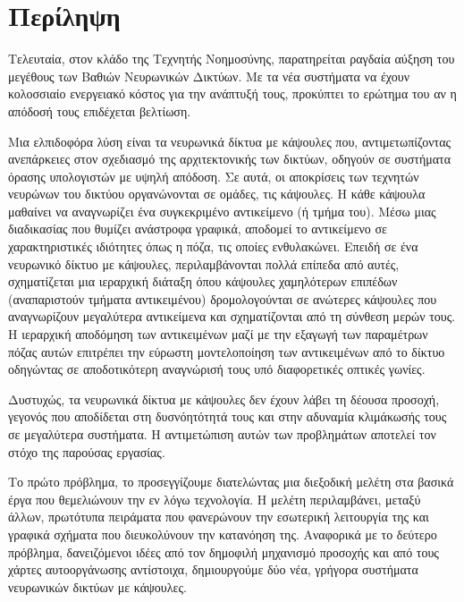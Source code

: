 \chapter*{Περίληψη}



Τελευταία, στον κλάδο της Τεχνητής Νοημοσύνης, παρατηρείται ραγδαία αύξηση του μεγέθους των Βαθιών Νευρωνικών Δικτύων. Με τα νέα συστήματα να έχουν κολοσσιαίο ενεργειακό κόστος για την ανάπτυξή τους, προκύπτει το ερώτημα του αν η απόδοσή τους επιδέχεται βελτίωση.\par

Μια ελπιδοφόρα λύση είναι τα νευρωνικά δίκτυα με κάψουλες που, αντιμετωπίζοντας ανεπάρκειες στον σχεδιασμό της αρχιτεκτονικής των δικτύων, οδηγούν σε συστήματα όρασης υπολογιστών με υψηλή απόδοση. Σε αυτά, οι αποκρίσεις των τεχνητών νευρώνων του δικτύου οργανώνονται σε ομάδες, τις κάψουλες. Η κάθε κάψουλα μαθαίνει να αναγνωρίζει ένα συγκεκριμένο αντικείμενο (ή τμήμα του). Μέσω μιας διαδικασίας που θυμίζει ανάστροφα γραφικά, αποδομεί το αντικείμενο σε χαρακτηριστικές ιδιότητες όπως η πόζα, τις οποίες ενθυλακώνει. Επειδή σε ένα νευρωνικό δίκτυο με κάψουλες, περιλαμβάνονται πολλά επίπεδα από αυτές, σχηματίζεται μια ιεραρχική διάταξη όπου κάψουλες χαμηλότερων επιπέδων (αναπαριστούν τμήματα αντικειμένου) δρομολογούνται σε ανώτερες κάψουλες που αναγνωρίζουν μεγαλύτερα αντικείμενα και σχηματίζονται από τη σύνθεση μερών τους. Η ιεραρχική αποδόμηση των αντικειμένων μαζί με την εξαγωγή των παραμέτρων πόζας αυτών επιτρέπει την εύρωστη μοντελοποίηση των αντικειμένων από το δίκτυο οδηγώντας σε αποδοτικότερη αναγνώρισή τους υπό διαφορετικές οπτικές γωνίες.\par

Δυστυχώς, τα νευρωνικά δίκτυα με κάψουλες δεν έχουν λάβει τη δέουσα προσοχή, γεγονός που αποδίδεται στη δυσνόητότητά τους και στην αδυναμία κλιμάκωσής τους σε μεγαλύτερα συστήματα. Η αντιμετώπιση αυτών των προβλημάτων αποτελεί τον στόχο της παρούσας εργασίας.\par

Το πρώτο πρόβλημα, το προσεγγίζουμε διατελώντας μια διεξοδική μελέτη στα βασικά έργα που θεμελιώνουν την εν λόγω τεχνολογία. Η μελέτη περιλαμβάνει, μεταξύ άλλων, πρωτότυπα πειράματα που φανερώνουν την εσωτερική λειτουργία της και γραφικά σχήματα που διευκολύνουν την κατανόηση της. Αναφορικά με το δεύτερο πρόβλημα, δανειζόμενοι ιδέες από τον δημοφιλή μηχανισμό προσοχής και από τους χάρτες αυτο\textendash οργάνωσης αντίστοιχα, δημιουργούμε δύο νέα, γρήγορα συστήματα νευρωνικών δικτύων με κάψουλες.\par

